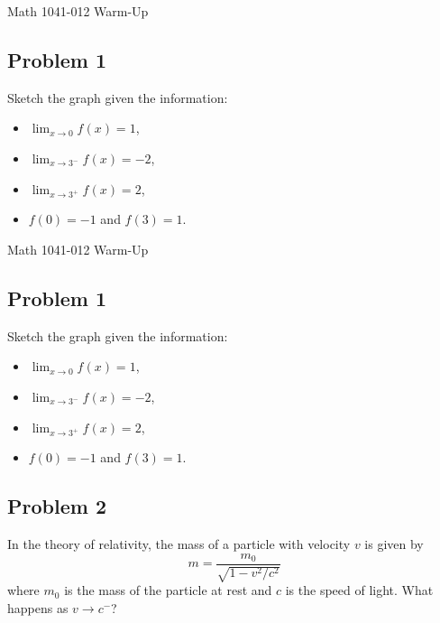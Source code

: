 \documentclass[10pt]{book}
\theoremstyle{definition}
\begin{document}
\begin{center}
{\Large Math 1041-012 \hspace{0.5cm} Warm-Up}
\end{center}
\vspace{0.2 cm}
\subsection*{Problem 1} Sketch the graph given the information:
\begin{itemize}
    \item $\displaystyle \lim_{x\rightarrow 0}f(x)=1$,
    \item $\displaystyle \lim_{x\rightarrow 3^-}f(x)=-2$,
    \item $\displaystyle \lim_{x\rightarrow 3^+}f(x)=2$,
    \item $f(0)=-1$ and $f(3)=1$.
\end{itemize}
\vspace{3cm}
\begin{center}
{\Large Math 1041-012 \hspace{0.5cm} Warm-Up}
\end{center}
\vspace{0.2 cm}
\subsection*{Problem 1} Sketch the graph given the information:
\begin{itemize}
    \item $\displaystyle \lim_{x\rightarrow 0}f(x)=1$,
    \item $\displaystyle \lim_{x\rightarrow 3^-}f(x)=-2$,
    \item $\displaystyle \lim_{x\rightarrow 3^+}f(x)=2$,
    \item $f(0)=-1$ and $f(3)=1$.
\end{itemize}
\pagebreak
\subsection*{Problem 2} In the theory of relativity, the mass of a particle with velocity $v$ is given by
\[
m=\frac{m_0}{\sqrt{1-v^2/c^2}}
\]
where $m_0$ is the mass of the particle at rest and $c$ is the speed of light. What happens as $v\rightarrow c^-$?
\vspace{7cm}
\end{document}
